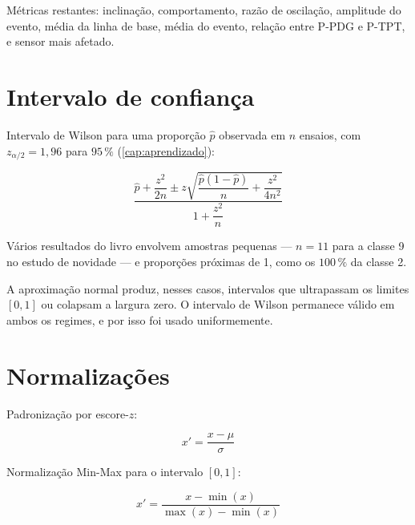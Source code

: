 Métricas restantes: inclinação, comportamento, razão de oscilação, amplitude do evento,
média da linha de base, média do evento, relação entre P-PDG e P-TPT, e sensor mais
afetado.

\section{Intervalo de confiança}

Intervalo de Wilson para uma proporção $\hat{p}$ observada em $n$ ensaios, com
$z_{\alpha/2} = 1{,}96$ para $95\,\%$ (\cref{cap:aprendizado}):

\begin{equation}
\frac{\hat{p} + \dfrac{z^2}{2n} \pm
z \sqrt{\dfrac{\hat{p}(1-\hat{p})}{n} + \dfrac{z^2}{4n^2}}}
{1 + \dfrac{z^2}{n}}
\label{eq:for-wilson}
\end{equation}

\begin{destaque}
Vários resultados do livro envolvem amostras pequenas --- $n = 11$ para a classe 9 no
estudo de novidade --- e proporções próximas de 1, como os $100\,\%$ da classe 2.

A aproximação normal produz, nesses casos, intervalos que ultrapassam os limites $[0,1]$
ou colapsam a largura zero. O intervalo de Wilson permanece válido em ambos os regimes, e
por isso foi usado uniformemente.
\end{destaque}

\section{Normalizações}

Padronização por escore-$z$:

\begin{equation}
x' = \frac{x - \mu}{\sigma}
\label{eq:for-zscore}
\end{equation}

Normalização Min-Max para o intervalo $[0,1]$:

\begin{equation}
x' = \frac{x - \min(x)}{\max(x) - \min(x)}
\label{eq:for-minmax}
\end{equation}
